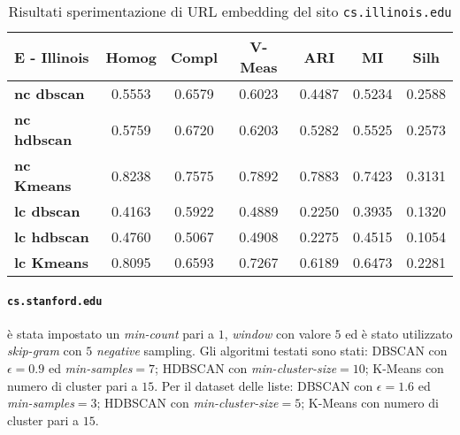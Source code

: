 \begin{table}[H]
	\begin{tabular}{| l | c | c | c | c | c | c |}
	\hline
	\textbf{E - Illinois}  & \textbf{Homog} & \textbf{Compl} & \textbf{V-Meas}  & \textbf{ARI}  & \textbf{MI}  & \textbf{Silh} \\ [3ex] \hline
	\textbf{nc dbscan} & 0.5553 & 0.6579 & 0.6023 & 0.4487 & 0.5234 & 0.2588\\ [3ex]
	 \hline 
	\textbf{nc hdbscan} & 0.5759 & 0.6720 & 0.6203 & 0.5282 & 0.5525 & 0.2573\\ [3ex]
	 \hline
	\textbf{nc Kmeans} & 0.8238 & 0.7575 & 0.7892 & 0.7883 & 0.7423 & 0.3131\\ [3ex]
	 \hline	
	\textbf{lc dbscan} & 0.4163 & 0.5922 & 0.4889 & 0.2250 & 0.3935 & 0.1320\\ [3ex]
	\hline
	\textbf{lc hdbscan} & 0.4760 & 0.5067 & 0.4908 & 0.2275 & 0.4515 & 0.1054\\ [3ex]
	\hline
	\textbf{lc Kmeans} & 0.8095 & 0.6593 & 0.7267 & 0.6189 & 0.6473 & 0.2281\\ [3ex]
	\hline
	\end{tabular}
	\caption{Risultati sperimentazione di URL embedding del sito \texttt{cs.illinois.edu}}
	\label{metricheEmbedIll}
\end{table}

\paragraph{\texttt{cs.stanford.edu}} è stata impostato un \textit{min-count} pari a $1$, \textit{window} con valore $5$ ed è stato utilizzato \textit{skip-gram} con $5$ \textit{negative} sampling. Gli algoritmi testati sono stati: DBSCAN con $\epsilon = 0.9$ ed \textit{min-samples}$ = 7$; HDBSCAN con \textit{min-cluster-size}$=10$; K-Means con numero di cluster pari a $15$. Per il dataset delle liste: DBSCAN con $\epsilon = 1.6$ ed \textit{min-samples}$ = 3$; HDBSCAN con \textit{min-cluster-size}$=5$; K-Means con numero di cluster pari a $15$.

